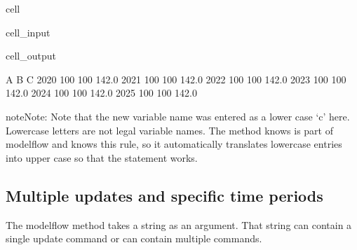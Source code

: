 \documentclass[letterpaper,10pt,english]{jupyterBook}
\begin{document}
\begin{sphinxuseclass}{cell}\begin{sphinxVerbatimInput}

\begin{sphinxuseclass}{cell_input}
\begin{sphinxVerbatim}[commandchars=\\\{\}]
\end{sphinxVerbatim}

\end{sphinxuseclass}\end{sphinxVerbatimInput}
\begin{sphinxVerbatimOutput}

\begin{sphinxuseclass}{cell_output}
\begin{sphinxVerbatim}[commandchars=\\\{\}]
        A    B      C
2020  100  100  142.0
2021  100  100  142.0
2022  100  100  142.0
2023  100  100  142.0
2024  100  100  142.0
2025  100  100  142.0
\end{sphinxVerbatim}

\end{sphinxuseclass}\end{sphinxVerbatimOutput}

\end{sphinxuseclass}
\begin{sphinxadmonition}{note}{Note:}
\sphinxAtStartPar
Note that the new variable name was entered as a lower case ‘c’ here.  Lowercase letters are not legal  variable names.  The  method knows is part of modelflow and knows this rule, so it automatically translates lowercase entries into upper case so that the statement works.
\end{sphinxadmonition}


\subsection{Multiple updates and specific time periods}
\label{\detokenize{content/04_PythonEssentials/UpdateCommand:multiple-updates-and-specific-time-periods}}
\sphinxAtStartPar
The modelflow method  takes a string as an argument.  That string can contain a single update command or can contain multiple commands.
\end{document}
